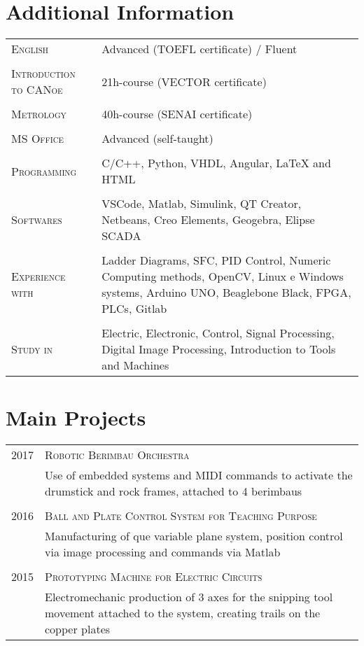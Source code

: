 \documentclass[a4paper,10pt]{article}
\begin{document}
\begin{flushleft}
\section{Additional Information}
\begin{tabular}{R{3cm}|p{11cm}}
 \textsc{English} & Advanced (TOEFL certificate) / Fluent \\   \\
 \textsc{Introduction to CANoe} & 21h-course (VECTOR certificate) \\   \\
 \textsc{Metrology} & 40h-course (SENAI certificate) \\   \\
 \textsc{MS Office} & Advanced (self-taught) \\   \\
 \textsc{Programming} & C/C++, Python, VHDL, Angular, LaTeX and HTML \\   \\
 \textsc{Softwares} & VSCode, Matlab, Simulink, QT Creator, Netbeans, Creo Elements, Geogebra, Elipse SCADA \\   \\
 \textsc{Experience with} & Ladder Diagrams, SFC, PID Control, Numeric Computing methods, OpenCV, Linux e Windows systems, Arduino UNO, Beaglebone Black, FPGA, PLCs, Gitlab \\   \\
 \textsc{Study in} & Electric, Electronic, Control, Signal Processing, Digital Image Processing, Introduction to Tools and Machines 
 \end{tabular}
 


\section{Main Projects}
\begin{tabular}{R{3cm}|p{11cm}}
\textsc{2017} & \textsc{Robotic Berimbau Orchestra} \\& Use of embedded systems and MIDI commands to activate the drumstick and rock frames, attached to 4 berimbaus \\  \\
\textsc{2016} & \textsc{Ball and Plate Control System for Teaching Purpose} \\ & Manufacturing of que variable plane system, position control via image processing and commands via Matlab \\  \\
\textsc{2015} & \textsc{Prototyping Machine for Electric Circuits} \\& Electromechanic production of 3 axes for the snipping tool movement attached to the system, creating trails on the copper plates 
\end{tabular}

\end{flushleft}


\end{document}

